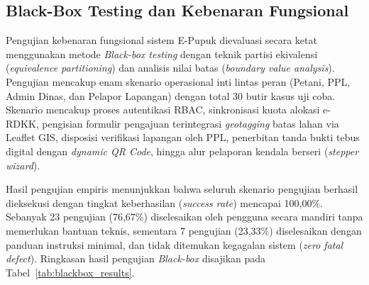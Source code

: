 ﻿\documentclass[conference]{IEEEtran}
\begin{document}
\subsection{Black-Box Testing dan Kebenaran Fungsional}
Pengujian kebenaran fungsional sistem E-Pupuk dievaluasi secara ketat menggunakan metode \textit{Black-box testing} dengan teknik partisi ekivalensi (\textit{equivalence partitioning}) dan analisis nilai batas (\textit{boundary value analysis}). Pengujian mencakup enam skenario operasional inti lintas peran (Petani, PPL, Admin Dinas, dan Pelapor Lapangan) dengan total 30 butir kasus uji coba. Skenario mencakup proses autentikasi RBAC, sinkronisasi kuota alokasi e-RDKK, pengisian formulir pengajuan terintegrasi \textit{geotagging} batas lahan via Leaflet GIS, disposisi verifikasi lapangan oleh PPL, penerbitan tanda bukti tebus digital dengan \textit{dynamic QR Code}, hingga alur pelaporan kendala berseri (\textit{stepper wizard}).

Hasil pengujian empiris menunjukkan bahwa seluruh skenario pengujian berhasil dieksekusi dengan tingkat keberhasilan (\textit{success rate}) mencapai 100,00\%. Sebanyak 23 pengujian (76,67\%) diselesaikan oleh pengguna secara mandiri tanpa memerlukan bantuan teknis, sementara 7 pengujian (23,33\%) diselesaikan dengan panduan instruksi minimal, dan tidak ditemukan kegagalan sistem (\textit{zero fatal defect}). Ringkasan hasil pengujian \textit{Black-box} disajikan pada Tabel~\ref{tab:blackbox_results}.

\begin{table}[htbp]
\caption{Rekapitulasi Pengujian Fungsional Black-Box Testing}
\begin{center}
\label{tab:blackbox_results}
\end{center}
\end{table}
\end{document}
